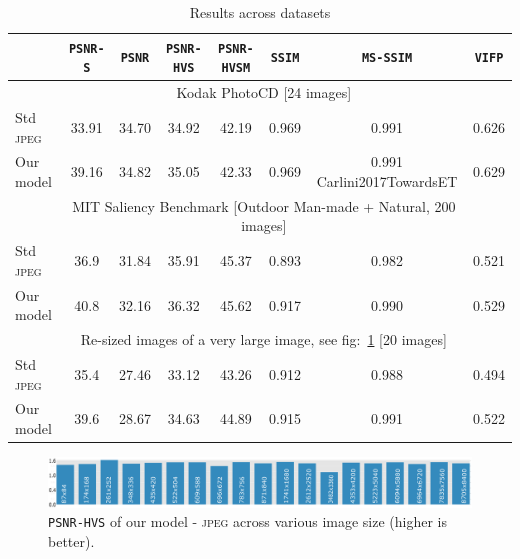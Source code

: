 \begin{table}[H]
\centering
{}
\begin{tabular}{lccccccc}
			 \toprule
               & \texttt{PSNR-S} \phantom{so} & \texttt{PSNR} \phantom{so} & \texttt{PSNR-HVS} \phantom{so}& \texttt{PSNR-HVSM} \phantom{so}& \texttt{SSIM} \phantom{so}& \texttt{MS-SSIM} \phantom{so}& \texttt{VIFP}\phantom{so} \\
              \midrule
              & \multicolumn{6}{c}{Kodak PhotoCD [24 images]}   &                        \\
              \midrule
Std \textsc{jpeg} &   33.91   & 34.70     & 34.92          & 42.19  & 0.969  & 0.991 & 0.626      \\
			  \cline{2-8}
Our model &  39.16    & 34.82    & 35.05          & 42.33  & 0.969  & 0.991 Carlini2017TowardsET& 0.629     \\
			  \midrule
              & \multicolumn{6}{c}{MIT Saliency Benchmark [Outdoor Man-made + Natural, 200 images]} &              \\
			  \midrule
Std \textsc{jpeg} & 36.9 & 31.84    & 35.91   & 45.37 & 0.893 & 0.982     & 0.521      \\
			  \cline{2-8}
Our model & 40.8 & 32.16   & 36.32   & 45.62 &  0.917 & 0.990      & 0.529      \\
			  \midrule
              & \multicolumn{6}{c}{Re-sized images of a very large image, see fig:~\ref{fig_size} [20 images]} &          \\
			  \midrule
Std \textsc{jpeg} & 35.4   & 27.46  & 33.12 & 43.26     & 0.912 & 0.988 & 0.494     \\
			  \cline{2-8}
Our model & 39.6  & 28.67  & 34.63 & 44.89     & 0.915 & 0.991 & 0.522     \\
			  \toprule
\end{tabular}
\caption[Results across various datasets]{Results across datasets \label{tbl_results}}
\end{table}
        
\begin{figure}[H]
    \centering
    \includegraphics[scale=0.23]{figures/semantic/image_size.pdf}
    \caption[Impact on Image Size]{\texttt{PSNR-HVS} of our model - \textsc{jpeg} across various image size (higher is better). \label{fig_size}}
\end{figure}

